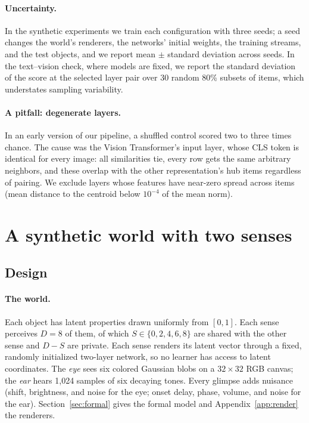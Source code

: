\documentclass[11pt]{article}
\begin{document}
\paragraph{Uncertainty.} In the synthetic experiments we train each configuration with three seeds; a seed changes the world's renderers, the networks' initial weights, the training streams, and the test objects, and we report mean $\pm$ standard deviation across seeds. In the text--vision check, where models are fixed, we report the standard deviation of the score at the selected layer pair over 30 random 80\% subsets of items, which understates sampling variability.

\paragraph{A pitfall: degenerate layers.} In an early version of our pipeline, a shuffled control scored two to three times chance. The cause was the Vision Transformer's input layer, whose CLS token is identical for every image: all similarities tie, every row gets the same arbitrary neighbors, and these overlap with the other representation's hub items \citep{radovanovic2010hubs} regardless of pairing. We exclude layers whose features have near-zero spread across items (mean distance to the centroid below $10^{-4}$ of the mean norm).

\section{A synthetic world with two senses}
\label{sec:synthetic}

\subsection{Design}

\paragraph{The world.} Each object has latent properties drawn uniformly from $[0,1]$. Each sense perceives $D=8$ of them, of which $S\in\{0,2,4,6,8\}$ are shared with the other sense and $D-S$ are private. Each sense renders its latent vector through a fixed, randomly initialized two-layer network, so no learner has access to latent coordinates. The \emph{eye} sees six colored Gaussian blobs on a $32\times32$ RGB canvas; the \emph{ear} hears 1{,}024 samples of six decaying tones. Every glimpse adds nuisance (shift, brightness, and noise for the eye; onset delay, phase, volume, and noise for the ear). Section~\ref{sec:formal} gives the formal model and Appendix~\ref{app:render} the renderers.
\end{document}
